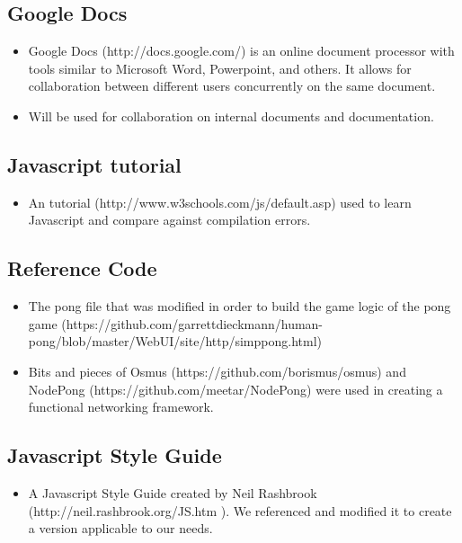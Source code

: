 \documentclass[letterpaper,12pt]{article}
\begin{document}
\subsection{Google Docs}
	\begin{itemize}
		\item Google Docs (http://docs.google.com/) is an online document processor with tools similar to Microsoft Word, Powerpoint, and others. It allows for collaboration between different users concurrently on the same document.
		\item Will be used for collaboration on internal documents and documentation.
	\end{itemize}
\subsection{Javascript tutorial}
\begin{itemize}
\item An tutorial (http://www.w3schools.com/js/default.asp) used to learn Javascript and compare against compilation errors.
\end{itemize}

\subsection{Reference Code}

\begin{itemize}
\item The pong file that was modified in order to build the game logic of the pong game (https://github.com/garrettdieckmann/human-pong/blob/master/WebUI/site/http/simppong.html)
\item Bits and pieces of Osmus (https://github.com/borismus/osmus) and NodePong (https://github.com/meetar/NodePong) were used in creating a functional networking framework.
\end{itemize}
\subsection{Javascript Style Guide}
\begin{itemize}
\item A Javascript Style Guide created by Neil Rashbrook (http://neil.rashbrook.org/JS.htm ). We referenced and modified it to create a version applicable to our needs.
\end{itemize}
\end{document}
